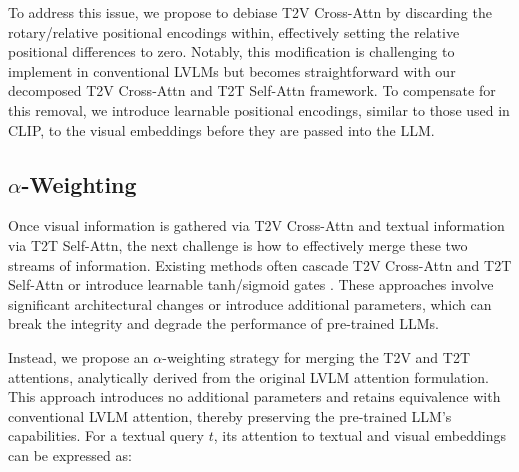 To address this issue, we propose to debiase T2V Cross-Attn by discarding the rotary/relative positional encodings within, effectively setting the relative positional differences to zero.
Notably, this modification is challenging to implement in conventional LVLMs but becomes straightforward with our decomposed T2V Cross-Attn and T2T Self-Attn framework.
To compensate for this removal, we introduce learnable positional encodings, similar to those used in CLIP, to the visual embeddings before they are passed into the LLM.


\subsection{$\alpha$-Weighting}\label{sec:alpha}

Once visual information is gathered via T2V Cross-Attn and textual information via T2T Self-Attn, the next challenge is how to effectively merge these two streams of information.
Existing methods often cascade T2V Cross-Attn and T2T Self-Attn \citep{flamingo} or introduce learnable tanh/sigmoid gates \citep{flamingo}.
These approaches involve significant architectural changes or introduce additional parameters, which can break the integrity and degrade the performance of pre-trained LLMs.


Instead, we propose an $\alpha$-weighting strategy for merging the T2V and T2T attentions, analytically derived from the original LVLM attention formulation.
This approach introduces no additional parameters and retains equivalence with conventional LVLM attention, thereby preserving the pre-trained LLM's capabilities.
For a textual query $t$, its attention to textual and visual embeddings can be expressed as:

